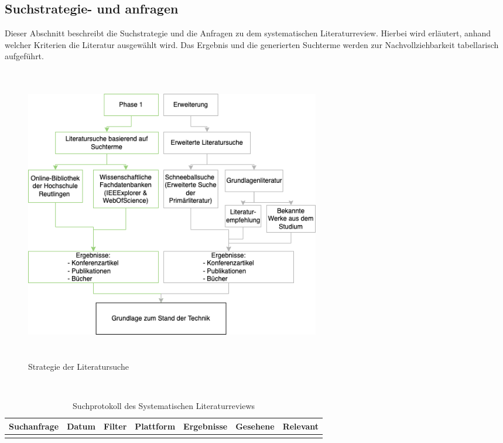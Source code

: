     \subsection{Suchstrategie- und anfragen}
        Dieser Abschnitt beschreibt die Suchstrategie und die Anfragen zu dem systematischen Literaturreview. Hierbei wird 
        erläutert, anhand welcher Kriterien die Literatur ausgewählt wird. Das Ergebnis und die generierten Suchterme werden 
        zur Nachvollziehbarkeit tabellarisch aufgeführt. 
        \begin{figure}[hbt!]
            \centering
            \includegraphics[width=13cm,height=13cm,keepaspectratio]{images/slr_walkthrough.png}
            \caption{Strategie der Literatursuche}
            \label{fig:slr}
        \end{figure}
        \\
    \begin{table}[hbt!]
        \begin{center}
            \begin{tabular}{| p{2.8cm} | p{1.9cm} | p{1.7cm} | p{1.9cm} | p{1.9cm} | p{1.8cm} | p{1.8cm} | }
                \hline
                   \textbf{Suchanfrage} & \textbf{Datum} & \textbf{Filter} & \textbf{Plattform} & \textbf{Ergebnisse} & \textbf{Gesehene} & \textbf{Relevant} \\
                \hline
                    &  &  &  &  &  &  \\ 
                \hline
            \end{tabular}
        \end{center}
        \caption{Suchprotokoll des Systematischen Literaturreviews}
        \label{tab:slr}
    \end{table}